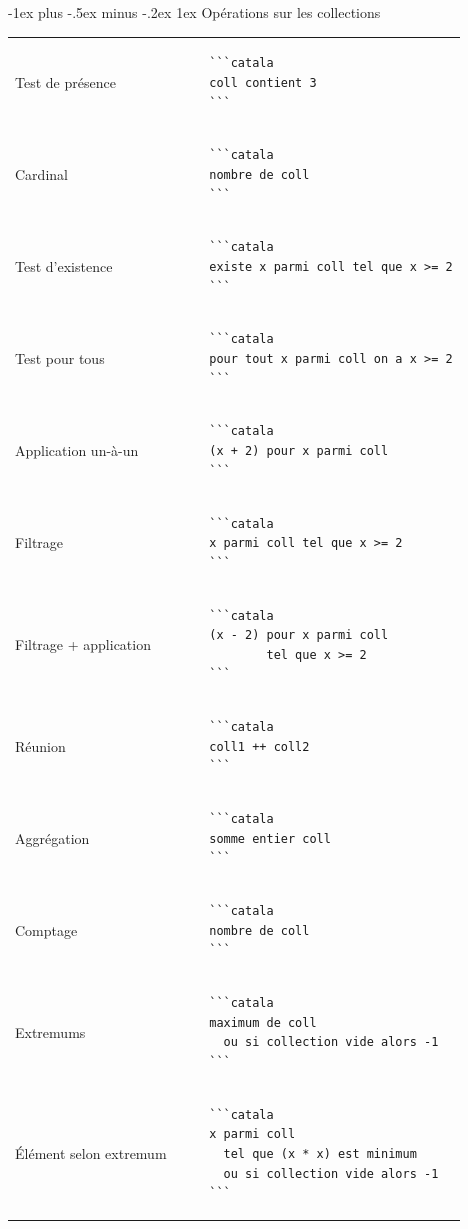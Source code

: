 \documentclass{article}
\makeatletter
\newcommand\articlenormalsize{\fontsize{10pt}{12pt}\selectfont}
\renewcommand{\section}{\@startsection{section}{1}{0mm}%
                                {-1ex plus -.5ex minus -.2ex}%
                                {1ex}%
                                {\normalfont\articlenormalsize\bfseries}}
\newenvironment{catala}{%
  \VerbatimEnvironment
  \let\FV@ListVSpace\relax
  \begin{verbatim}}%
 {\end{verbatim}}
\makeatother
\begin{document}
\begin{multicols}{3}
\section{Opérations sur les collections}

\begin{tabular}{@{}p{\cola}p{\colb}@{}}
  
  Test de présence& \begin{catala}
    ```catala
    coll contient 3
    ```
  \end{catala}
  \\
  Cardinal & \begin{catala}
    ```catala
    nombre de coll
    ```
  \end{catala}
  \\
  Test d'existence & \begin{catala}
    ```catala
    existe x parmi coll tel que x >= 2
    ```
  \end{catala}
  \\
  Test pour tous & \begin{catala}
    ```catala
    pour tout x parmi coll on a x >= 2
    ```
  \end{catala}
  \\
  Application un-à-un & \begin{catala}
    ```catala
    (x + 2) pour x parmi coll
    ```
  \end{catala}
  \\
  Filtrage & \begin{catala}
    ```catala
    x parmi coll tel que x >= 2
    ```
  \end{catala}
  \\
  Filtrage + application & \begin{catala}
    ```catala
    (x - 2) pour x parmi coll
            tel que x >= 2
    ```
  \end{catala}
  \\
  Réunion & \begin{catala}
    ```catala
    coll1 ++ coll2
    ```
  \end{catala}
  \\
  Aggrégation & \begin{catala}
    ```catala
    somme entier coll
    ```
  \end{catala}
  \\
  Comptage & \begin{catala}
    ```catala
    nombre de coll
    ```
  \end{catala}
  \\
  Extremums & \begin{catala}
    ```catala
    maximum de coll
      ou si collection vide alors -1
    ```
  \end{catala}
  \\
  Élément selon extremum & \begin{catala}
    ```catala
    x parmi coll
      tel que (x * x) est minimum
      ou si collection vide alors -1
    ```
  \end{catala}
  \\
\end{tabular}

\end{multicols}
\end{document}
